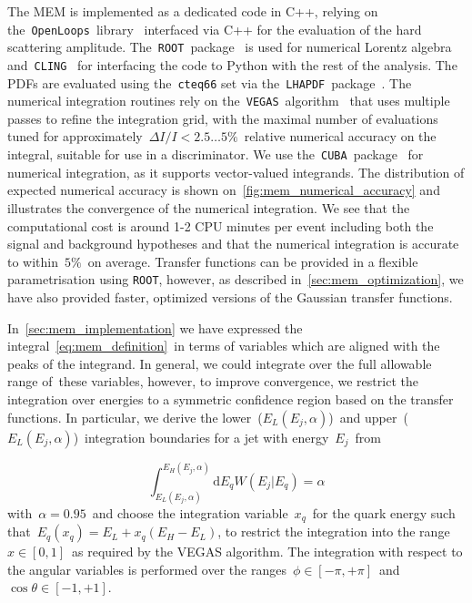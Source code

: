 The MEM is implemented as a dedicated code in C++, relying on the~\texttt{OpenLoops}~library~\cite{Cascioli:2011va} interfaced via C++ for the evaluation of the hard scattering amplitude. The~\texttt{ROOT}~package~\cite{Brun:1997pa} is used for numerical Lorentz algebra and~\texttt{CLING}~\cite{Vasilev:2012ev} for interfacing the code to Python with the rest of the analysis. The PDFs are evaluated using the~\texttt{cteq66} set via the~\texttt{LHAPDF}~package~\cite{Buckley:2014ana}. The numerical integration routines rely on the~\texttt{VEGAS}~algorithm~\cite{Lepage:1977sw} that uses multiple passes to refine the integration grid, with the maximal number of evaluations tuned for approximately~$\Delta I / I < 2.5 \dots 5\%$~relative numerical accuracy on the integral, suitable for use in a discriminator. We use the~\texttt{CUBA}~package~\cite{Hahn:2004fe} for numerical integration, as it supports vector-valued integrands. The distribution of expected numerical accuracy is shown on~\cref{fig:mem_numerical_accuracy} and illustrates the convergence of the numerical integration. We see that the computational cost is around 1-2 CPU minutes per event including both the signal and background hypotheses and that the numerical integration is accurate to within~$5\%$~on average. Transfer functions can be provided in a flexible parametrisation using \texttt{ROOT}, however, as described in~\cref{sec:mem_optimization}, we have also provided faster, optimized versions of the Gaussian transfer functions.

In~\cref{sec:mem_implementation} we have expressed the integral~\cref{eq:mem_definition}~in terms of variables which are aligned with the peaks of the integrand. In general, we could integrate over the full allowable range of these variables, however, to improve convergence, we restrict the integration over energies to a symmetric confidence region based on the transfer functions. In particular, we derive the lower~($E_L(E_j,\alpha)$)~and upper~($E_L(E_j,\alpha)$)~integration boundaries for a jet with energy~$E_j$~from

\begin{equation}
\int_{E_L(E_j,\alpha)}^{E_H(E_j,\alpha)} \mathrm{d}E_q W(E_j | E_q) = \alpha
\end{equation}
with~$\alpha = 0.95$~and choose the integration variable~$x_q$~for the quark energy such that~$E_q(x_q) = E_L + x_q (E_H - E_L)$, to restrict the integration into the range~$x\in[0,1]$~as required by the VEGAS algorithm. The integration with respect to the angular variables is performed over the ranges~$\phi \in [-\pi, +\pi]$~and~$\cos{\theta} \in [-1, +1]$.


